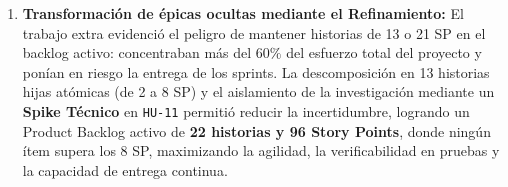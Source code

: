 \begin{enumerate}
    \item \textbf{Transformación de épicas ocultas mediante el Refinamiento:} El trabajo extra evidenció el peligro de mantener historias de 13 o 21 SP en el backlog activo: concentraban más del $60\%$ del esfuerzo total del proyecto y ponían en riesgo la entrega de los sprints. La descomposición en 13 historias hijas atómicas (de 2 a 8 SP) y el aislamiento de la investigación mediante un \textbf{Spike Técnico} en \texttt{HU-11} permitió reducir la incertidumbre, logrando un Product Backlog activo de \textbf{22 historias y 96 Story Points}, donde ningún ítem supera los 8 SP, maximizando la agilidad, la verificabilidad en pruebas y la capacidad de entrega continua.
\end{enumerate}
